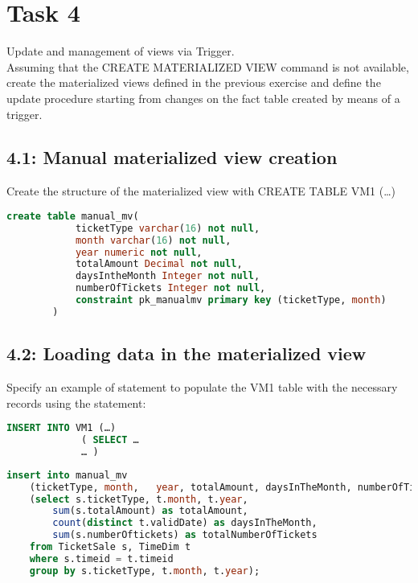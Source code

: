 \section{Task 4}

\begin{question}
    Update and management of views via Trigger.\\
    Assuming that the CREATE MATERIALIZED VIEW command is not available, create the
    materialized views defined in the previous exercise and define the update procedure
    starting from changes on the fact table created by means of a trigger.
\end{question}

\subsection{4.1: Manual materialized view creation}

\begin{question}
    Create the structure of the materialized view with CREATE TABLE VM1 (…)
\end{question}
    \begin{lstlisting}[language = SQL]
        create table manual_mv(
            ticketType varchar(16) not null,
            month varchar(16) not null,
            year numeric not null,
            totalAmount Decimal not null,
            daysIntheMonth Integer not null,
            numberOfTickets Integer not null,
            constraint pk_manualmv primary key (ticketType, month)
        )
    \end{lstlisting}
\begin{answer}
\end{answer}

\subsection{4.2: Loading data in the materialized view}

\begin{question}
     Specify an example of statement to populate the VM1 table with the necessary
records using the statement:
    \begin{lstlisting}[language = SQL]
         INSERT INTO VM1 (…)
             ( SELECT …
             … )
    \end{lstlisting}

\end{question}

\begin{answer}
    \begin{lstlisting}[language = SQL]
insert into manual_mv
    (ticketType, month,   year, totalAmount, daysInTheMonth, numberOfTickets)
    (select s.ticketType, t.month, t.year,
        sum(s.totalAmount) as totalAmount,
        count(distinct t.validDate) as daysInTheMonth,
        sum(s.numberOftickets) as totalNumberOfTickets
    from TicketSale s, TimeDim t
    where s.timeid = t.timeid
    group by s.ticketType, t.month, t.year);
    \end{lstlisting}
\end{answer}

